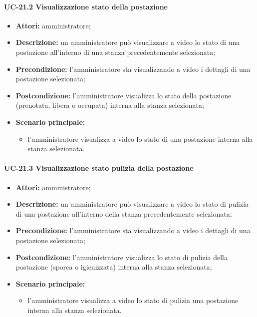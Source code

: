 \paragraph{UC-21.2 Visualizzazione stato della postazione}
\begin{itemize}
    \item \textbf{Attori:} amministratore;
    \item \textbf{Descrizione:} un amministratore pu\`{o} visualizzare a video lo stato di una postazione all'interno di una stanza precedentemente selezionata;
    \item \textbf{Precondizione:} l'amministratore sta visualizzando a video i dettagli di una postazione selezionata;
    \item \textbf{Postcondizione:} l'amministratore visualizza lo stato della postazione (prenotata, libera o occupata) interna alla stanza selezionata;
    \item \textbf{Scenario principale:}
    \begin{itemize}
        \item l'amministratore visualizza a video lo stato di una postazione interna alla stanza selezionata.
    \end{itemize}
\end{itemize}
    

\paragraph{UC-21.3 Visualizzazione stato pulizia della postazione} %
\begin{itemize}
    \item \textbf{Attori:} amministratore;
    \item \textbf{Descrizione:} un amministratore pu\`{o} visualizzare a video lo stato di pulizia di una postazione all'interno della stanza precedentemente selezionata;
    \item \textbf{Precondizione:} l'amministratore sta visualizzando a video i dettagli di una postazione selezionata;
    \item \textbf{Postcondizione:} l'amministratore visualizza lo stato di pulizia della postazione (sporca o igienizzata) interna alla stanza selezionata;
    \item \textbf{Scenario principale:}
    \begin{itemize}
        \item l'amministratore visualizza a video lo stato di pulizia una postazione interna alla stanza selezionata.
    \end{itemize}
\end{itemize}


